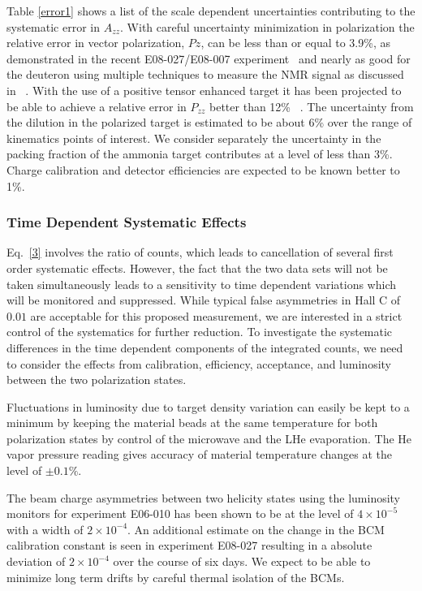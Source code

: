 Table \ref{error1} shows a list of the scale dependent uncertainties contributing to the systematic error in $A_{zz}$.
With careful uncertainty minimization in polarization the relative error in vector polarization, $Pz$, can be less than or equal to 3.9\%, as demonstrated in the recent E08-027/E08-007 experiment~\cite{NIMDUST} and nearly as good for the deuteron using multiple techniques to measure the NMR signal as discussed in ~\cite{PTSTDUST}.  With the use of a positive tensor enhanced target it has been projected to be able to achieve a relative error in $P_{zz}$ better than 12\% ~\cite{PTSTDUST}.  The uncertainty from the dilution in the polarized target is estimated to be
about 6\% over the range of kinematics points of interest.  We consider separately the uncertainty in the packing fraction of the ammonia target contributes at a level of less than 3\%. Charge calibration and detector efficiencies are expected to be known better to 1\%. 

\subsubsection*{Time Dependent Systematic Effects}
Eq.~\ref{3} involves the ratio of counts, which leads to cancellation of several first order systematic effects.  However, the fact that the two data sets will not be taken simultaneously leads to a sensitivity to time dependent variations which will be monitored and suppressed. While typical false asymmetries in Hall C of $0.01$ are acceptable for this proposed measurement, we are interested in a strict control of the systematics for further reduction.
%
To investigate the systematic differences in the time dependent components of the integrated counts, we need to consider the effects from calibration, efficiency, acceptance, and luminosity between the two polarization states.

Fluctuations in luminosity due to target density variation can easily be kept to a minimum by keeping the material beads at the same temperature for both polarization states by control of the microwave and the LHe evaporation.  The He vapor pressure reading gives accuracy of material temperature changes at the level of $\pm0.1\%$.

The beam charge asymmetries between two helicity states using the luminosity monitors for experiment
E06-010 has been shown to be at the level of $4 \times 10^{-5}$ with a width of $2 \times 10^{-4}$.
An additional estimate on the change in the BCM calibration constant is seen in
experiment E08-027 resulting in a absolute deviation of $2 \times 10^{-4}$ over the course of six
days. We expect to be able to minimize long term drifts by careful thermal isolation of
the BCMs.

